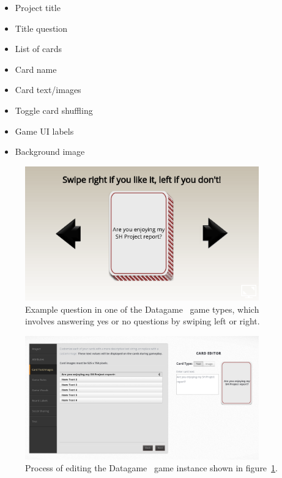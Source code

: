 \begin{itemize}
    \item Project title
    \item Title question
    \item List of cards
    \item Card name
    \item Card text/images
    \item Toggle card shuffling
    \item Game UI labels
    \item Background image
\end{itemize}

\begin{figure}[!h]
	\centering
	\includegraphics[width=0.9\textwidth]{./images/context/datagame.png}
	\caption{Example question in one of the Datagame~\cite{Datagame} game types, which involves answering yes or no questions by swiping left or right.}
	\label{fig:datagame}
\end{figure}

\begin{figure}[!h]
	\centering
	\includegraphics[width=0.9\textwidth]{./images/context/dg_editor.png}
	\caption{Process of editing the Datagame~\cite{Datagame} game instance shown in figure~\ref{fig:datagame}. }
	\label{fig:dg_editor}
\end{figure}

